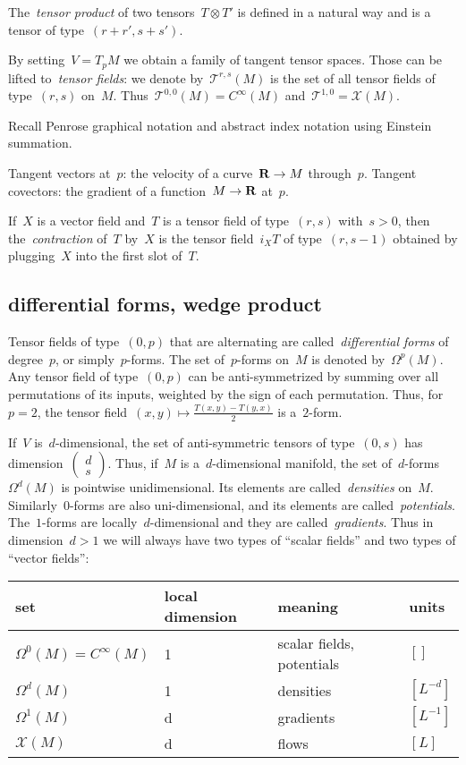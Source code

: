 The~\emph{tensor product} of two tensors~$T\otimes T'$ is defined in a natural
way and is a tensor of type~$(r+r',s+s')$.

By setting~$V=T_pM$ we obtain a family of tangent tensor spaces.  Those can
be lifted to~\emph{tensor fields}: we denote by~$\mathcal{T}^{r,s}(M)$ is the
set of all tensor fields of type~$(r,s)$ on~$M$.
Thus~$\mathcal{T}^{0,0}(M)=C^\infty(M)$
and~$\mathcal{T}^{1,0}=\mathcal{X}(M)$.

Recall Penrose graphical notation and abstract index notation using Einstein
summation.

Tangent vectors at~$p$: the velocity of a curve~$\mathbf{R}\to M$
through~$p$.  Tangent covectors: the gradient of a function~$M\to\mathbf{R}$ at~$p$.

If~$X$ is a vector field and~$T$ is a tensor field of type~$(r,s)$
with~$s>0$, then the~\emph{contraction} of~$T$ by~$X$ is the tensor
field~$i_XT$ of
type~$(r,s-1)$ obtained by plugging~$X$ into the first slot of~$T$.

\subsection{differential forms, wedge product}

Tensor fields of type~$(0,p)$ that are alternating are
called~\emph{differential forms} of degree~$p$, or simply~$p$-forms.
The set of~$p$-forms on~$M$ is denoted by~$\Omega^p(M)$.
Any tensor field of type~$(0,p)$ can be anti-symmetrized by summing over all
permutations of its inputs, weighted by the sign of each permutation.  Thus,
for~$p=2$, the tensor field~$(x,y)\mapsto\frac{T(x,y)-T(y,x)}2$ is
a~$2$-form.

If~$V$ is~$d$-dimensional, the set of anti-symmetric tensors of type~$(0,s)$ has
dimension~$\begin{pmatrix}d\\s\end{pmatrix}$.  Thus, if~$M$ is
a~$d$-dimensional manifold, the set of~$d$-forms~$\Omega^d(M)$ is pointwise
unidimensional.  Its elements are called~\emph{densities} on~$M$.
Similarly~$0$-forms are also uni-dimensional, and its elements are
called~\emph{potentials}.  The~$1$-forms are locally~$d$-dimensional and they
are called~\emph{gradients}.  Thus in dimension~$d>1$ we will always have two
types of ``scalar fields'' and two types of ``vector fields'':

\begin{tabular}{l|l|l|l}
	set & local dimension & meaning & units \\
	\hline
	$\Omega^0(M)=C^\infty(M)$ & 1 & scalar fields, potentials & $[]$ \\
	$\Omega^d(M)$ & 1 & densities & $[L^{-d}]$ \\
	$\Omega^1(M)$ & d & gradients & $[L^{-1}]$ \\
	$\mathcal{X}(M)$ & d& flows & $[L]$ \\
\end{tabular}

